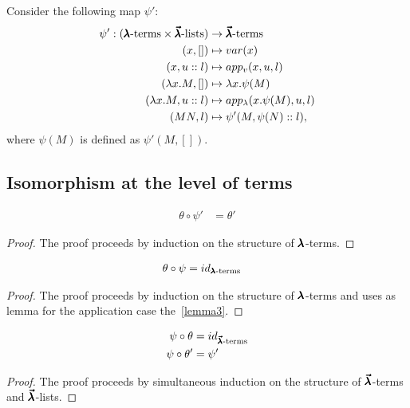 \begin{definition}
  Consider the following map $\psi'$:
  \begin{align*}
    \psi' : (\pmb{\lambda} \text{-terms} \times \pmb{\vec \lambda} \text{-lists}) &\to \pmb{\vec \lambda} \text{-terms} \\
    (x, []) &\mapsto var(x) \\
    (x, u::l) &\mapsto app_v (x, u, l) \\
    (\lambda x . M, []) &\mapsto \lambda x . \psi(M) \\
    (\lambda x . M, u::l) &\mapsto app_\lambda (x . \psi(M), u, l) \\
    (M N, l) &\mapsto \psi'(M, \psi(N)::l),              
  \end{align*}
  where $\psi(M)$ is defined as $\psi'(M, [])$.
\end{definition}

\subsection{Isomorphism at the level of terms}

\begin{lemma}
  \label{lemma3}
  \begin{align*}
    \theta \circ \psi' &= \theta'    
  \end{align*}
\end{lemma}
\begin{proof}
  The proof proceeds by induction on the structure of $\pmb{\lambda}$-terms.
\end{proof}


\begin{theorem}
  \label{theorem5}
  \begin{align*}
    \theta \circ \psi &= id_{\pmb{\lambda} \text{-terms}}
  \end{align*}
\end{theorem}
\begin{proof}
  The proof proceeds by induction on the structure of $\pmb{\lambda}$-terms and uses as lemma for the application case the~\cref{lemma3}.
\end{proof}


\begin{theorem}
  \label{theorem6}
  \begin{align*}
    \psi \circ \theta &= id_{\pmb{\vec \lambda} \text{-terms}} \\
    \psi \circ \theta' &= \psi'    
  \end{align*}
\end{theorem}
\begin{proof}
  The proof proceeds by simultaneous induction on the structure of $\pmb{\vec \lambda}$-terms and $\pmb{\vec \lambda}$-lists.
\end{proof}


